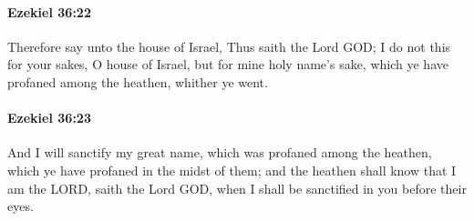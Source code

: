 		\paragraph{Ezekiel 36:22} %
			\label{EZEKIEL-36-22}

			Therefore say unto the house of Israel, Thus saith the Lord GOD; I do not this for your sakes, O house of Israel, but for mine holy name’s sake, which ye have profaned among the heathen, whither ye went.


		\paragraph{Ezekiel 36:23} %
			\label{EZEKIEL-36-23}

			And I will sanctify my great name, which was profaned among the heathen, which ye have profaned in the midst of them; and the heathen shall know that I am the LORD, saith the Lord GOD, when I shall be sanctified in you before their eyes.

